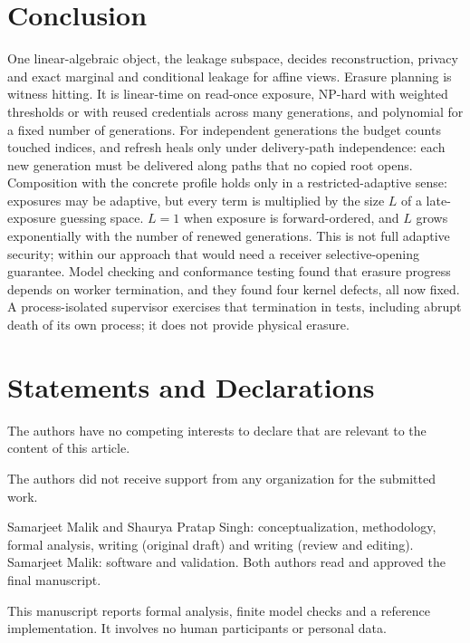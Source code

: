 \documentclass[pdflatex,sn-mathphys-num,twocolumn]{sn-jnl}
\theoremstyle{plain}
\theoremstyle{definition}
\begin{document}
\section{Conclusion}
One linear-algebraic object, the leakage subspace, decides reconstruction, privacy and exact marginal and conditional leakage for affine views. Erasure planning is witness hitting. It is linear-time on read-once exposure, NP-hard with weighted thresholds or with reused credentials across many generations, and polynomial for a fixed number of generations. For independent generations the budget counts touched indices, and refresh heals only under delivery-path independence: each new generation must be delivered along paths that no copied root opens. Composition with the concrete profile holds only in a restricted-adaptive sense: exposures may be adaptive, but every term is multiplied by the size $L$ of a late-exposure guessing space. $L=1$ when exposure is forward-ordered, and $L$ grows exponentially with the number of renewed generations. This is not full adaptive security; within our approach that would need a receiver selective-opening guarantee. Model checking and conformance testing found that erasure progress depends on worker termination, and they found four kernel defects, all now fixed. A process-isolated supervisor exercises that termination in tests, including abrupt death of its own process; it does not provide physical erasure.


\backmatter
\section*{Statements and Declarations}

The authors have no competing interests to declare that are relevant to the content of this article.

The authors did not receive support from any organization for the submitted work.

Samarjeet Malik and Shaurya Pratap Singh: conceptualization, methodology, formal analysis, writing (original draft) and writing (review and editing). Samarjeet Malik: software and validation. Both authors read and approved the final manuscript.

This manuscript reports formal analysis, finite model checks and a reference implementation. It involves no human participants or personal data.
\end{document}
